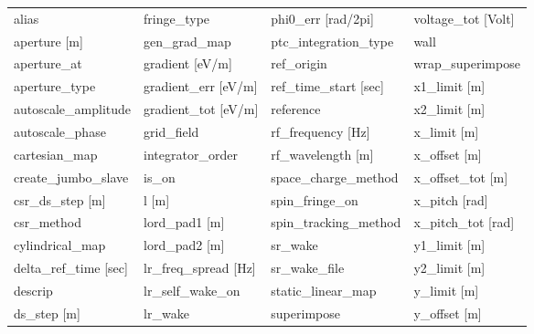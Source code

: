 \begin{tabular}{llll} \toprule
alias                            & fringe_type                      & phi0_err [rad/2pi]               & voltage_tot [Volt]               \\
aperture [m]                     & gen_grad_map                     & ptc_integration_type             & wall                             \\
aperture_at                      & gradient [eV/m]                  & ref_origin                       & wrap_superimpose                 \\
aperture_type                    & gradient_err [eV/m]              & ref_time_start [sec]             & x1_limit [m]                     \\
autoscale_amplitude              & gradient_tot [eV/m]              & reference                        & x2_limit [m]                     \\
autoscale_phase                  & grid_field                       & rf_frequency [Hz]                & x_limit [m]                      \\
cartesian_map                    & integrator_order                 & rf_wavelength [m]                & x_offset [m]                     \\
create_jumbo_slave               & is_on                            & space_charge_method              & x_offset_tot [m]                 \\
csr_ds_step [m]                  & l [m]                            & spin_fringe_on                   & x_pitch [rad]                    \\
csr_method                       & lord_pad1 [m]                    & spin_tracking_method             & x_pitch_tot [rad]                \\
cylindrical_map                  & lord_pad2 [m]                    & sr_wake                          & y1_limit [m]                     \\
delta_ref_time [sec]             & lr_freq_spread [Hz]              & sr_wake_file                     & y2_limit [m]                     \\
descrip                          & lr_self_wake_on                  & static_linear_map                & y_limit [m]                      \\
ds_step [m]                      & lr_wake                          & superimpose                      & y_offset [m]                     \\

\end{tabular}
